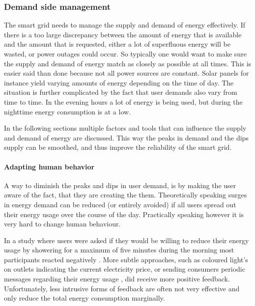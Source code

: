\subsubsection{Demand side management}

The smart grid needs to manage the supply and demand of energy effectively. If there is a too large discrepancy between the amount of energy that is available and the amount that is requested, either a lot of superfluous energy will be wasted, or power outages could occur.
So typically one would want to make sure the supply and demand of energy match as closely as possible at all times. This is easier said than done because not all power sources are constant. Solar panels for instance yield varying amounts of energy depending on the time of day. The situation is further complicated by the fact that user demands also vary from time to time. In the evening hours a lot of energy is being used, but during the nighttime energy consumption is at a low.

In the following sections multiple factors and tools that can influence the supply and demand of energy are discussed. This way the peaks in demand and the dips supply can be smoothed, and thus improve the reliability of the smart grid.

\paragraph{Adapting human behavior}

A way to diminish the peaks and dips in user demand, is by making the user aware of the fact, that they are creating the them. Theoretically speaking surges in energy demand can be reduced (or entirely avoided) if all users spread out their energy usage over the course of the day. Practically speaking however it is very hard to change human behaviour.

In a study where users were asked if they would be willing to reduce their energy usage by showering for a maximum of five minutes during the morning most participants reacted negatively \cite{GouldenBedwellRennick-EgglestoneEtAl2014}. More subtle approaches, such as coloured light's on outlets indicating the current electricity price, or sending consumers periodic messages regarding their energy usage \cite{AyresRasemanShih2012}, did receive more positive feedback. Unfortunately, less intrusive forms of feedback are often not very effective and only reduce the total energy consumption marginally.


